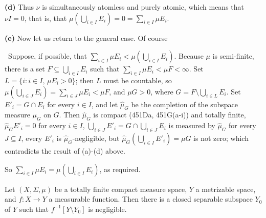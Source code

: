 {\medskip

{\bf (d)} Thus $\nu$ is simultaneously atomless and purely atomic, which
means that $\nu I=0$, that is, that
$\mu(\bigcup_{i\in I}E_i)=0=\sum_{i\in I}\mu E_i$.

\medskip

{\bf (e)} Now let us return to the general case.   Of course


\noindent\Quer\ Suppose, if possible, that
$\sum_{i\in I}\mu E_i<\mu(\bigcup_{i\in I}E_i)$.
Because $\mu$ is semi-finite, there is
a set $F\subseteq\bigcup_{i\in I}E_i$ such that
$\sum_{i\in I}\mu E_i<\mu F<\infty$.   Set $L=\{i:i\in I,\,\mu E_i>0\}$;
then $L$ must be
countable, so $\mu(\bigcup_{i\in J}E_i)=\sum_{i\in J}\mu E_i<\mu F$, and
$\mu G>0$, where $G=F\setminus\bigcup_{i\in L}E_i$.   Set
$E'_i=G\cap E_i$ for every $i\in I$, and let $\hat\mu_G$ be the
completion of the subspace measure $\mu_G$ on $G$.
Then $\hat\mu_G$ is compact (451Da, 451G(a-i)) and totally finite,
$\hat\mu_GE'_i=0$ for
every $i\in I$, $\bigcup_{i\in J}E'_i=G\cap\bigcup_{i\in J}E_i$ is
measured by
$\hat\mu_G$ for every $J\subseteq I$, every $E'_i$ is
$\hat\mu_G$-negligible,
but $\hat\mu_G(\bigcup_{i\in I}E'_i)=\mu G$ is not zero;
which contradicts the result of (a)-(d) above.\ \Bang

So $\sum_{i\in I}\mu E_i=\mu(\bigcup_{i\in I}E_i)$, as required.
}%

 Let $(X,\Sigma,\mu)$ be a totally finite compact
measure space, $Y$ a metrizable space, and $f:X\to Y$ a measurable
function.  Then there is a closed separable subspace $Y_0$ of $Y$ such
that $f^{-1}[Y\setminus Y_0]$ is negligible.

